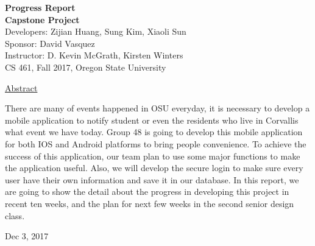 \documentclass[letterpaper, 10pt,titlepage]{article}
\newcommand\tab[1][1cm]{\hspace*{#1}}
\begin{document}
\begin{titlepage}
\begin{center}
    \Huge
    \textbf{Progress Report}\\
    \textbf{Capstone Project}\\
    \vspace{1.0cm}
    \large
    Developers: Zijian Huang, Sung Kim, Xiaoli Sun\\
    Sponsor: David Vasquez\\
    \vspace{1.5cm}
    \large
    Instructor: D. Kevin McGrath, Kirsten Winters\\

    \large
    CS 461, Fall 2017, Oregon State University\\    

    \vspace{3.2cm}

    \large
    \underline{Abstract}\\
    \vspace{0.3cm}
    \end{center}
    \large

    \tab There are many of events happened in OSU everyday, it is necessary to develop a mobile application to notify student or even the residents who live in Corvallis what event we have today. Group 48 is going to develop this mobile application for both IOS and Android platforms to bring people convenience. To achieve the success of this application, our team plan to use some major functions to make the application useful. Also, we will develop the secure login to make sure every user have their own information and save it in our database. In this report, we are going to show the detail about the progress in developing this project in recent ten weeks, and the plan for next few weeks in the second senior design class.  
    
    \vspace{0.8cm}
    \vfill
    
\begin{center}    
    Dec 3, 2017

\end{center}
\end{titlepage}
\end{document}
